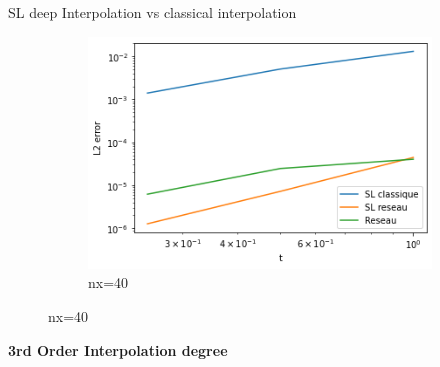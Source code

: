 \begin{frame}{SL deep Interpolation vs classical interpolation}
\begin{figure}
\begin{subfigure}{0.2\textwidth}
            \centering
            \includegraphics[width=\textwidth]{images/i1.png}
            \caption{nx=40}
        \end{subfigure}
    
    \end{figure}

    \textbf{3rd Order Interpolation degree}
    \begin{figure}
        \centering
        

\end{figure}
\end{frame}
